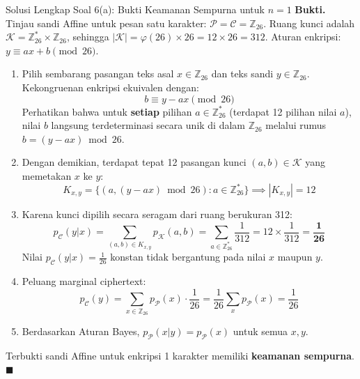 \documentclass[11pt,a4paper]{article}
\newenvironment{proof}{\noindent\textbf{Bukti.}}{\hfill$\blacksquare$\vspace{0.3em}}
\begin{document}
\begin{solusibox}{Solusi Lengkap Soal 6(a): Bukti Keamanan Sempurna untuk $n = 1$}
\begin{proof}
Tinjau sandi Affine untuk pesan satu karakter: $\mathcal{P} = \mathcal{C} = \mathbb{Z}_{26}$.
Ruang kunci adalah $\mathcal{K} = \mathbb{Z}_{26}^* \times \mathbb{Z}_{26}$, sehingga $|\mathcal{K}| = \varphi(26) \times 26 = 12 \times 26 = 312$.
Aturan enkripsi: $y \equiv ax + b \pmod{26}$.
\begin{enumerate}
    \item Pilih sembarang pasangan teks asal $x \in \mathbb{Z}_{26}$ dan teks sandi $y \in \mathbb{Z}_{26}$.
    Kekongruenan enkripsi ekuivalen dengan:
    \[
    b \equiv y - ax \pmod{26}
    \]
    Perhatikan bahwa untuk \textbf{setiap} pilihan $a \in \mathbb{Z}_{26}^*$ (terdapat 12 pilihan nilai $a$), nilai $b$ langsung terdeterminasi secara unik di dalam $\mathbb{Z}_{26}$ melalui rumus $b = (y - ax) \bmod 26$.
    \item Dengan demikian, terdapat tepat 12 pasangan kunci $(a, b) \in \mathcal{K}$ yang memetakan $x$ ke $y$:
    \[
    K_{x,y} = \{(a, (y - ax) \bmod 26) : a \in \mathbb{Z}_{26}^*\} \implies |K_{x,y}| = 12
    \]
    \item Karena kunci dipilih secara seragam dari ruang berukuran 312:
    \[
    p_{\mathcal{C}}(y|x) = \sum_{(a,b) \in K_{x,y}} p_{\mathcal{K}}(a, b) = \sum_{a \in \mathbb{Z}_{26}^*} \frac{1}{312} = 12 \times \frac{1}{312} = \mathbf{\frac{1}{26}}
    \]
    Nilai $p_{\mathcal{C}}(y|x) = \frac{1}{26}$ konstan tidak bergantung pada nilai $x$ maupun $y$.
    \item Peluang marginal ciphertext:
    \[
    p_{\mathcal{C}}(y) = \sum_{x \in \mathbb{Z}_{26}} p_{\mathcal{P}}(x) \cdot \frac{1}{26} = \frac{1}{26} \sum_{x} p_{\mathcal{P}}(x) = \frac{1}{26}
    \]
    \item Berdasarkan Aturan Bayes, $p_{\mathcal{P}}(x|y) = p_{\mathcal{P}}(x)$ untuk semua $x, y$.
\end{enumerate}
Terbukti sandi Affine untuk enkripsi 1 karakter memiliki \textbf{keamanan sempurna}.
\end{proof}
\end{solusibox}

\vspace{0.3cm}
\end{document}
